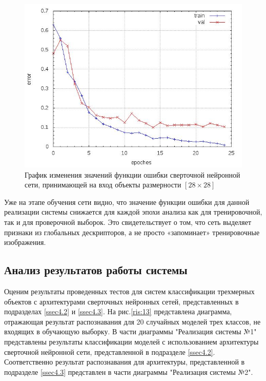 \documentclass[14pt]{article}
\numberwithin{figure}{section}
\numberwithin{equation}{section}
\begin{document}
\begin{figure}[h]
   \begin{center}
       \includegraphics[scale=0.6] {12.JPG}
       \caption{График изменения значений функции ошибки сверточной нейронной сети, принимающей на вход объекты размерности $[28 \times 28]$}
       \label{ris:12}
   \end{center}
\end{figure}

Уже на этапе обучения сети видно, что значение функции ошибки для данной реализации системы снижается для каждой эпохи анализа как для тренировочной, так и для проверочной выборок. Это свидетельствует о том, что сеть выделяет признаки из глобальных дескрипторов, а не просто «запоминает» тренировочные изображения.

\subsection{Анализ результатов работы системы}

Оценим результаты проведенных тестов для систем классификации трехмерных объектов с архитектурами сверточных нейронных сетей, представленных в подразделах \ref{ssec4.2} и \ref{ssec4.3}. На рис.\ref{ris:13} представлена диаграмма, отражающая результат распознавания для 20 случайных моделей трех классов, не входящих в обучающую выборку. В части диаграммы "Реализация системы №1" представлены результаты классификации моделей с использованием архитектуры сверточной нейронной сети, представленной в подразделе \ref{ssec4.2}. Соответственно результат распознавания для архитектуры, представленной в подразделе \ref{ssec4.3} представлен в части диаграммы "Реализация системы №2".
\end{document}
